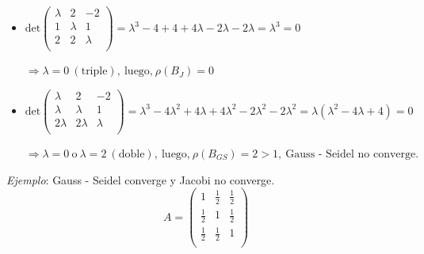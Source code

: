 \begin{itemize}
	\item $\text{det}
	\begin{pmatrix}
        \lambda & 2 & -2\\
		1 & \lambda & 1\\
		2 & 2 & \lambda\\        
	\end{pmatrix}
	= \lambda^{3} - 4 + 4 + 4\lambda - 2\lambda - 2\lambda = \lambda^{3} = 0$
	
	$\Rightarrow \lambda = 0\ (\text{triple}),\ \text{luego,}\ \rho(B_{J}) = 0$
	
	\item $\text{det}
	\begin{pmatrix}
        \lambda & 2 & -2\\
		\lambda & \lambda & 1\\
		2\lambda & 2\lambda & \lambda\\        
	\end{pmatrix}
	= \lambda^{3} - 4\lambda^{2} + 4\lambda + 4\lambda^{2} - 2\lambda^{2} - 2\lambda^{2} = \lambda(\lambda^{2} - 4\lambda + 4) = 0 $
	
$\Rightarrow \lambda = 0\ \text{o}\ \lambda = 2\ (\text{doble}),\ \text{luego,}\ \rho(B_{GS}) = 2 > 1,\ \text{Gauss - Seidel no converge.}$\\
\end{itemize}

\textit{Ejemplo}: Gauss - Seidel converge y Jacobi no converge.\\

$$A =
	\begin{pmatrix}
        1 & \frac{1}{2} & \frac{1}{2}\\
		\frac{1}{2} & 1 & \frac{1}{2}\\
		\frac{1}{2} & \frac{1}{2} & 1\\        
	\end{pmatrix}
$$

